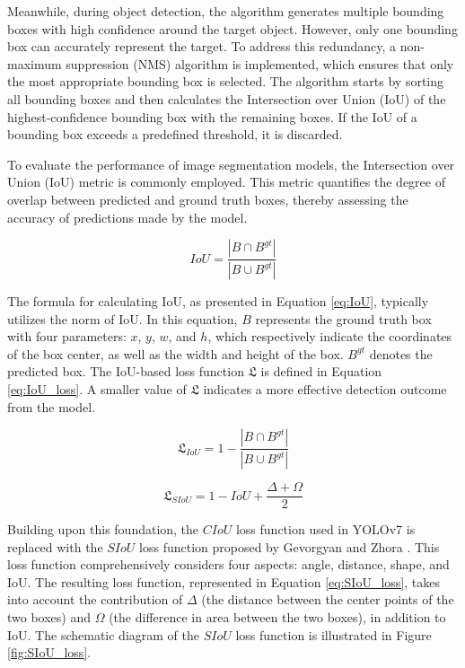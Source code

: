 \documentclass[aic]{iosart2x}
\begin{document}
Meanwhile, during object detection, the algorithm generates multiple bounding boxes with high confidence around the target object. However, only one bounding box can accurately represent the target. To address this redundancy, a non-maximum suppression (NMS) algorithm is implemented, which ensures that only the most appropriate bounding box is selected. The algorithm starts by sorting all bounding boxes and then calculates the Intersection over Union (IoU) of the highest-confidence bounding box with the remaining boxes. If the IoU of a bounding box exceeds a predefined threshold, it is discarded.

To evaluate the performance of image segmentation models, the Intersection over Union (IoU) metric is commonly employed. This metric quantifies the degree of overlap between predicted and ground truth boxes, thereby assessing the accuracy of predictions made by the model.

\begin{equation}
 IoU = \frac{\left\lvert B \cap B^{gt} \right\rvert }{\left\lvert B \cup B^{gt} \right\rvert } \label{eq:IoU}
\end{equation}

The formula for calculating IoU, as presented in Equation \ref{eq:IoU}, typically utilizes the norm of IoU. In this equation, $B$ represents the ground truth box with four parameters: $x$, $y$, $w$, and $h$, which respectively indicate the coordinates of the box center, as well as the width and height of the box. $B^{gt}$ denotes the predicted box. The IoU-based loss function $\mathfrak{L}$ is defined in Equation \ref{eq:IoU_loss}. A smaller value of $\mathfrak{L}$ indicates a more effective detection outcome from the model.

\begin{equation}
    \mathfrak{L}_{IoU}= 1 - \frac{\left\lvert B \cap B^{gt} \right\rvert }{\left\lvert B \cup B^{gt} \right\rvert }  \label{eq:IoU_loss}
\end{equation}

\begin{equation}
    \mathfrak{L}_{SIoU} = 1 - IoU+ \frac{\Delta + \Omega}{2} \label{eq:SIoU_loss}
\end{equation}

Building upon this foundation, the $CIoU$ loss function used in YOLOv7 is replaced with the $SIoU$ loss function proposed by Gevorgyan and Zhora \cite{Gevorgyan-225}. This loss function comprehensively considers four aspects: angle, distance, shape, and IoU. The resulting loss function, represented in Equation \ref{eq:SIoU_loss}, takes into account the contribution of $\Delta$ (the distance between the center points of the two boxes) and $\Omega$ (the difference in area between the two boxes), in addition to IoU. The schematic diagram of the $SIoU$ loss function is illustrated in Figure \ref{fig:SIoU_loss}.
\end{document}
